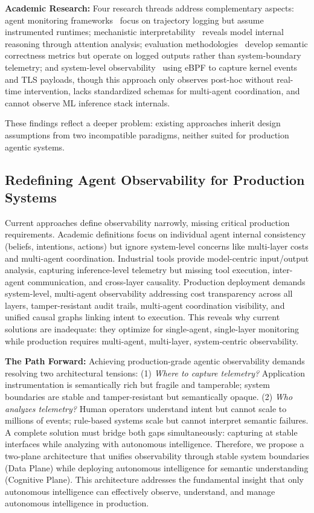 \documentclass[sigplan,screen,9pt]{acmart}
\begin{document}
\textbf{Academic Research:} Four research threads address complementary aspects: agent monitoring frameworks~\cite{Rombaut2025Watson,Dong2024AgentOps} focus on trajectory logging but assume instrumented runtimes; mechanistic interpretability~\cite{Kim2025AgenticInterp} reveals model internal reasoning through attention analysis; evaluation methodologies~\cite{Moshkovich2025Pipeline} develop semantic correctness metrics but operate on logged outputs rather than system-boundary telemetry; and system-level observability~\cite{zheng2025agentsight} using eBPF to capture kernel events and TLS payloads, though this approach only observes post-hoc without real-time intervention, lacks standardized schemas for multi-agent coordination, and cannot observe ML inference stack internals.

These findings reflect a deeper problem: existing approaches inherit design assumptions from two incompatible paradigms, neither suited for production agentic systems.

\subsection{Redefining Agent Observability for Production Systems}

Current approaches define observability narrowly, missing critical production requirements. Academic definitions focus on individual agent internal consistency (beliefs, intentions, actions) but ignore system-level concerns like multi-layer costs and multi-agent coordination. Industrial tools provide model-centric input/output analysis, capturing inference-level telemetry but missing tool execution, inter-agent communication, and cross-layer causality. Production deployment demands system-level, multi-agent observability addressing cost transparency across all layers, tamper-resistant audit trails, multi-agent coordination visibility, and unified causal graphs linking intent to execution. This reveals why current solutions are inadequate: they optimize for single-agent, single-layer monitoring while production requires multi-agent, multi-layer, system-centric observability.

\textbf{The Path Forward:} Achieving production-grade agentic observability demands resolving two architectural tensions: (1) \emph{Where to capture telemetry?} Application instrumentation is semantically rich but fragile and tamperable; system boundaries are stable and tamper-resistant but semantically opaque. (2) \emph{Who analyzes telemetry?} Human operators understand intent but cannot scale to millions of events; rule-based systems scale but cannot interpret semantic failures. A complete solution must bridge both gaps simultaneously: capturing at stable interfaces while analyzing with autonomous intelligence. Therefore, we propose a two-plane architecture that unifies observability through stable system boundaries (Data Plane) while deploying autonomous intelligence for semantic understanding (Cognitive Plane). This architecture addresses the fundamental insight that only autonomous intelligence can effectively observe, understand, and manage autonomous intelligence in production.
\end{document}
